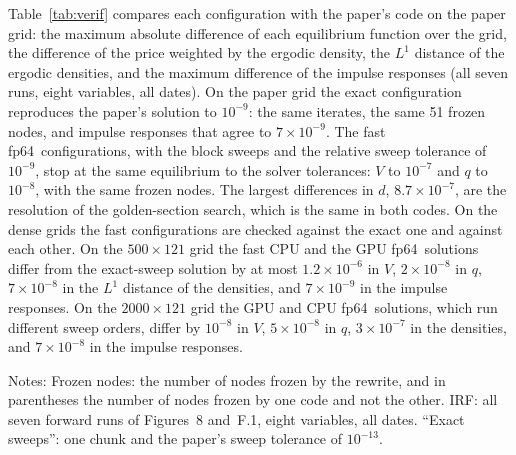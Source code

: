 \documentclass[11pt]{article}
\newcommand{\fpd}{\textsf{fp64}}
\begin{document}
Table~\ref{tab:verif} compares each configuration with the paper's code on the paper grid: the maximum absolute difference of each equilibrium function over the grid, the difference of the price weighted by the ergodic density, the $L^1$ distance of the ergodic densities, and the maximum difference of the impulse responses (all seven runs, eight variables, all dates). On the paper grid the exact configuration reproduces the paper's solution to $10^{-9}$: the same iterates, the same 51 frozen nodes, and impulse responses that agree to $7\times10^{-9}$. The fast \fpd\ configurations, with the block sweeps and the relative sweep tolerance of $10^{-9}$, stop at the same equilibrium to the solver tolerances: $V$ to $10^{-7}$ and $q$ to $10^{-8}$, with the same frozen nodes. The largest differences in $d$, $8.7\times10^{-7}$, are the resolution of the golden-section search, which is the same in both codes. On the dense grids the fast configurations are checked against the exact one and against each other. On the $500\times121$ grid the fast CPU and the GPU \fpd\ solutions differ from the exact-sweep solution by at most $1.2\times10^{-6}$ in $V$, $2\times10^{-8}$ in $q$, $7\times10^{-8}$ in the $L^1$ distance of the densities, and $7\times10^{-9}$ in the impulse responses. On the $2000\times121$ grid the GPU and CPU \fpd\ solutions, which run different sweep orders, differ by $10^{-8}$ in $V$, $5\times10^{-8}$ in $q$, $3\times10^{-7}$ in the densities, and $7\times10^{-8}$ in the impulse responses.

\begin{table}[htbp]
\centering
\caption{Verification against the paper's code, paper grid}
\label{tab:verif}
\footnotesize
{}
\par\smallskip\begin{minipage}{\textwidth}\footnotesize Notes: Frozen nodes: the number of nodes frozen by the rewrite, and in parentheses the number of nodes frozen by one code and not the other. IRF: all seven forward runs of Figures~8 and~F.1, eight variables, all dates. ``Exact sweeps'': one chunk and the paper's sweep tolerance of $10^{-13}$.
\end{minipage}
\end{table}
\end{document}
